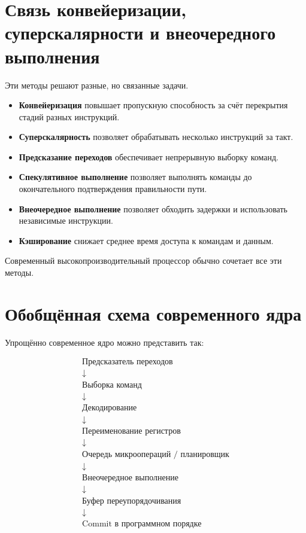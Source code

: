 \documentclass[12pt,a4paper]{article}
\begin{document}
\section{Связь конвейеризации, суперскалярности и внеочередного выполнения}

Эти методы решают разные, но связанные задачи.

\begin{itemize}
    \item \textbf{Конвейеризация} повышает пропускную способность за счёт перекрытия стадий разных инструкций.
    \item \textbf{Суперскалярность} позволяет обрабатывать несколько инструкций за такт.
    \item \textbf{Предсказание переходов} обеспечивает непрерывную выборку команд.
    \item \textbf{Спекулятивное выполнение} позволяет выполнять команды до окончательного подтверждения правильности пути.
    \item \textbf{Внеочередное выполнение} позволяет обходить задержки и использовать независимые инструкции.
    \item \textbf{Кэширование} снижает среднее время доступа к командам и данным.
\end{itemize}

Современный высокопроизводительный процессор обычно сочетает все эти методы.

\section{Обобщённая схема современного ядра}

Упрощённо современное ядро можно представить так:

\[
\begin{array}{c}
\text{Предсказатель переходов} \\
\downarrow \\
\text{Выборка команд} \\
\downarrow \\
\text{Декодирование} \\
\downarrow \\
\text{Переименование регистров} \\
\downarrow \\
\text{Очередь микроопераций / планировщик} \\
\downarrow \\
\text{Внеочередное выполнение} \\
\downarrow \\
\text{Буфер переупорядочивания} \\
\downarrow \\
\text{Commit в программном порядке}
\end{array}
\]
\end{document}
